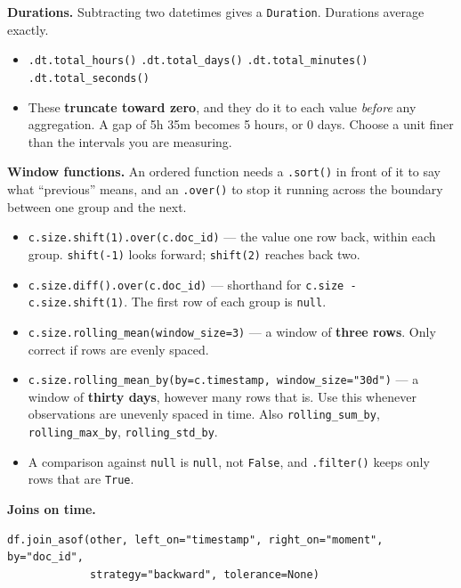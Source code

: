 \documentclass[11pt, a4paper]{article}
\newcommand{\code}[1]{\texttt{#1}}
\begin{document}
\smallskip

\textbf{Durations.}
Subtracting two datetimes gives a \code{Duration}. Durations average exactly.

\begin{itemize}
  \item \code{.dt.total\_hours()} \quad \code{.dt.total\_days()} \quad
        \code{.dt.total\_minutes()} \quad \code{.dt.total\_seconds()}
  \item These \textbf{truncate toward zero}, and they do it to each value \textit{before} any
        aggregation. A gap of 5h 35m becomes 5 hours, or 0 days. Choose a unit finer than the
        intervals you are measuring.
\end{itemize}

\textbf{Window functions.}
An ordered function needs a \code{.sort()} in front of it to say what ``previous'' means, and
an \code{.over()} to stop it running across the boundary between one group and the next.

\begin{itemize}
  \item \code{c.size.shift(1).over(c.doc\_id)} --- the value one row back, within each group.
        \code{shift(-1)} looks forward; \code{shift(2)} reaches back two.
  \item \code{c.size.diff().over(c.doc\_id)} --- shorthand for \code{c.size - c.size.shift(1)}.
        The first row of each group is \code{null}.
  \item \code{c.size.rolling\_mean(window\_size=3)} --- a window of \textbf{three rows}. Only
        correct if rows are evenly spaced.
  \item \code{c.size.rolling\_mean\_by(by=c.timestamp, window\_size="30d")} --- a window of
        \textbf{thirty days}, however many rows that is. Use this whenever observations are
        unevenly spaced in time. Also \code{rolling\_sum\_by}, \code{rolling\_max\_by},
        \code{rolling\_std\_by}.
  \item A comparison against \code{null} is \code{null}, not \code{False}, and
        \code{.filter()} keeps only rows that are \code{True}.
\end{itemize}

\smallskip

\textbf{Joins on time.}

\begin{verbatim}
df.join_asof(other, left_on="timestamp", right_on="moment", by="doc_id",
             strategy="backward", tolerance=None)
\end{verbatim}
\end{document}
